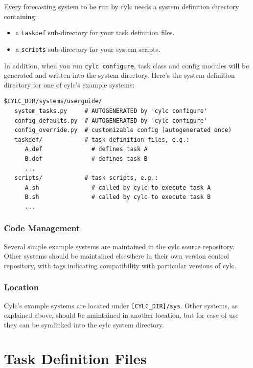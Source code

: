 \documentclass[11pt,a4paper]{article}
\begin{document}
Every forecasting system to be run by cylc needs a system definition
directory containing: 

\begin{itemize} 
    \item a \lstinline=taskdef= sub-directory for your task definition
        files.
    \item a \lstinline=scripts= sub-directory for your system scripts.
\end{itemize} 

In addition, when you run \lstinline{cylc configure}, task class and
config modules will be generated and written into the system directory.
Here's the system definition directory for one of cylc's example
systems: 

\lstset{language=bash}
\begin{lstlisting}
$CYLC_DIR/systems/userguide/
   system_tasks.py     # AUTOGENERATED by 'cylc configure' 
   config_defaults.py  # AUTOGENERATED by 'cylc configure' 
   config_override.py  # customizable config (autogenerated once) 
   taskdef/            # task definition files, e.g.:
      A.def              # defines task A
      B.def              # defines task B
      ...
   scripts/            # task scripts, e.g.:
      A.sh               # called by cylc to execute task A
      B.sh               # called by cylc to execute task B
      ...
\end{lstlisting}

\subsubsection{Code Management}

Several simple example systems are maintained in the cylc source
repository.  Other systems should be maintained elsewhere in their
own version control repository, with tags indicating compatibility with
particular versions of cylc.

\subsubsection{Location}

Cylc's example systems are located under \lstinline=[CYLC_DIR]/sys=.
Other systems, as explained above, should be maintained in another
location, but for ease of use they can be symlinked into the cylc system
directory.



\section{Task Definition Files} 
\label{TaskDefinitionFiles}
\end{document}
